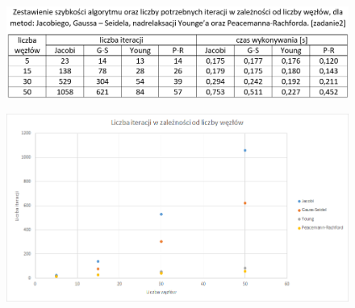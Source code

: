 \newpage

\begin{figure}[!ht]
	\begin{center}
		\includegraphics[width=1\textwidth]{Lab6/charts/zestawienie_zad2.png}
	\end{center}
\end{figure}

\begin{figure}[!ht]
	\begin{center}
		\includegraphics[width=1\textwidth]{Lab6/charts/zestawienie_wykres_zad2.png}
	\end{center}
\end{figure}